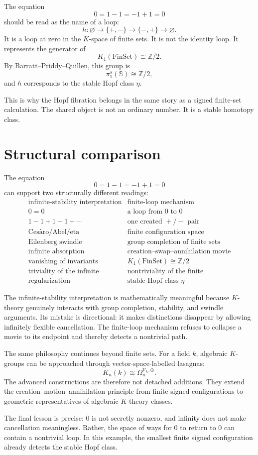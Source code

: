 The equation
\[
  0=1-1=-1+1=0
\]
should be read as the name of a loop:
\[
  h:\varnothing\to\{+,-\}\to\{-,+\}\to\varnothing.
\]
It is a loop at zero in the \(K\)-space of finite sets.  It is not the identity loop.  It represents the generator of
\[
  K_1(\mathrm{FinSet})\cong\mathbb Z/2.
\]
By Barratt--Priddy--Quillen, this group is
\[
  \pi_1^s(\mathbb S)\cong\mathbb Z/2,
\]
and \(h\) corresponds to the stable Hopf class \(\eta\).

This is why the Hopf fibration belongs in the same story as a signed finite-set calculation.  The shared object is not an ordinary number.  It is a stable homotopy class.

\section{Structural comparison}

The equation
\[
  0=1-1=-1+1=0
\]
can support two structurally different readings:
\[
\begin{array}{c|c}
\text{infinite-stability interpretation} & \text{finite-loop mechanism}\\
\hline
0=0 & \text{a loop from \(0\) to \(0\)}\\
1-1+1-1+\cdots & \text{one created \(+\)/\(-\) pair}\\
\text{Ces\`aro/Abel/eta} & \text{finite configuration space}\\
\text{Eilenberg swindle} & \text{group completion of finite sets}\\
\text{infinite absorption} & \text{creation--swap--annihilation movie}\\
\text{vanishing of invariants} & K_1(\mathrm{FinSet})\cong\mathbb Z/2\\
\text{triviality of the infinite} & \text{nontriviality of the finite}\\
\text{regularization} & \text{stable Hopf class \(\eta\)}
\end{array}
\]

The infinite-stability interpretation is mathematically meaningful because \(K\)-theory genuinely interacts with group completion, stability, and swindle arguments.  Its mistake is directional: it makes distinctions disappear by allowing infinitely flexible cancellation.  The finite-loop mechanism refuses to collapse a movie to its endpoint and thereby detects a nontrivial path.

The same philosophy continues beyond finite sets.  For a field \(k\), algebraic \(K\)-groups can be approached through vector-space-labelled lasagnas:
\[
  K_n(k)\cong \Omega_n^{\mathcal V_k,\oplus}.
\]
The advanced constructions are therefore not detached additions.  They extend the creation--motion--annihilation principle from finite signed configurations to geometric representatives of algebraic \(K\)-theory classes.

The final lesson is precise: \(0\) is not secretly nonzero, and infinity does not make cancellation meaningless.  Rather, the space of ways for \(0\) to return to \(0\) can contain a nontrivial loop.  In this example, the smallest finite signed configuration already detects the stable Hopf class.

